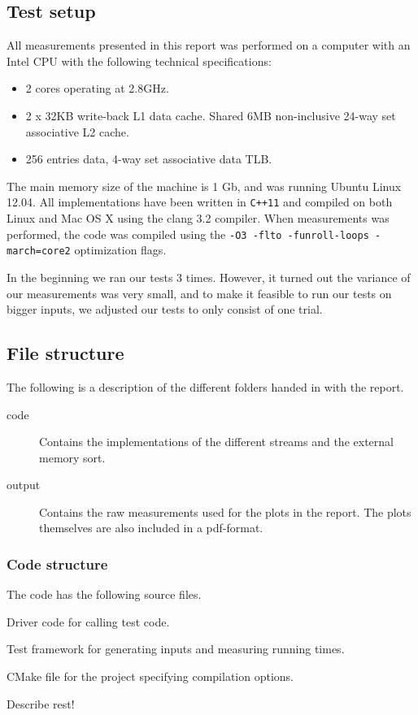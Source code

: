 \documentclass[a4paper,12pt]{article}
\begin{document}
\subsection{Test setup}
All measurements presented in this report was performed on a computer
with an Intel  CPU with the following technical
specifications:
\begin{itemize}
\item 2 cores operating at 2.8GHz.
\item 2 x 32KB write-back L1 data cache. Shared 6MB non-inclusive 24-way set associative L2 cache.
\item 256 entries data, 4-way set associative data TLB.
\end{itemize}
The main memory size of the machine is 1 Gb, and was running Ubuntu
Linux 12.04. All implementations have been
written in \texttt{C++11} and compiled on both Linux and Mac OS X
using the clang 3.2 compiler. When measurements was performed, the
code was compiled using the \texttt{-O3 -flto -funroll-loops -march=core2}
optimization flags.

In the beginning we ran our tests 3 times. However, it turned out the
variance of our measurements was very small, and to make it feasible
to run our tests on bigger inputs, we adjusted our tests to only
consist of one trial.

\subsection{File structure}
The following is a description of the different folders handed in with
the report.
\begin{description}
\item[code] Contains the implementations of the different streams and
  the external memory sort.

\item[output] Contains the raw measurements used for the plots in the
  report. The plots themselves are also included in a pdf-format.
\end{description}

\subsubsection{Code structure}
The code has the following source files.
\begin{description}
\item[main.cpp] Driver code for calling test code.
\item[Test.hpp] Test framework for generating inputs and measuring
  running times.
\item[CMakeLists.txt] CMake file for the project specifying
  compilation options.

\item Describe rest!
\end{description}
\end{document}
